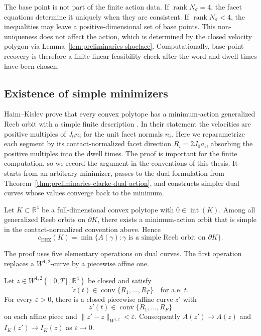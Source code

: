 \begin{remark}
The base point is not part of the finite action data. If
\(\operatorname{rank}N_\sigma=4\), the facet equations determine it uniquely
when they are consistent. If \(\operatorname{rank}N_\sigma<4\), the inequalities
may leave a positive-dimensional set of base points. This non-uniqueness does
not affect the action, which is determined by the closed velocity polygon via
Lemma~\ref{lem:preliminaries-shoelace}. Computationally, base-point recovery is
therefore a finite linear feasibility check after the word and dwell times have
been chosen.
\end{remark}

\subsection{Existence of simple minimizers}
\label{subsec:generalized-reeb-orbits-polytopes-existence-of-simple-minimizers}

Haim--Kislev prove that every convex polytope has a minimum-action generalized
Reeb orbit with a simple finite description \cite[Theorem~1.5]{HK2017}. In
their statement the velocities are positive multiples of \(J_0n_i\) for the
unit facet normals \(n_i\). Here we reparametrize each segment by its
contact-normalized facet direction \(R_i=2J_0a_i\), absorbing the positive
multiples into the dwell times. The proof is important for the finite
computation, so we record the argument in the conventions of this thesis. It
starts from an arbitrary minimizer, passes to the dual formulation from
Theorem~\ref{thm:preliminaries-clarke-dual-action}, and constructs simpler
dual curves whose values converge back to the minimum.

\begin{theorem}\label{thm:generalized-reeb-simple-minimizer}
Let \(K\subset\mathbb{R}^4\) be a full-dimensional convex polytope with
\(0\in\operatorname{int}(K)\). Among all generalized Reeb orbits on
\(\partial K\), there exists a minimum-action orbit that is simple in the
contact-normalized convention above. Hence
\[
  c_{\mathrm{EHZ}}(K)
  =
  \min\{A(\gamma):\gamma
  \text{ is a simple Reeb orbit on }\partial K\}.
\]
\end{theorem}

The proof uses five elementary operations on dual curves. The first operation
replaces a \(W^{1,2}\)-curve by a piecewise affine one.

\begin{lemma}\label{lem:generalized-reeb-pw-affine-approx}
Let \(z\in W^{1,2}([0,T],\mathbb{R}^4)\) be closed and satisfy
\[
  \dot z(t)\in\operatorname{conv}\{R_1,\ldots,R_F\}
  \quad\text{for a.e. }t.
\]
For every \(\varepsilon>0\), there is a closed piecewise affine curve \(z'\)
with
\[
  \dot z'(t)\in\operatorname{conv}\{R_1,\ldots,R_F\}
\]
on each affine piece and \(\|z'-z\|_{W^{1,2}}<\varepsilon\). Consequently
\(A(z')\to A(z)\) and \(I_K(z')\to I_K(z)\) as \(\varepsilon\to0\).
\end{lemma}

